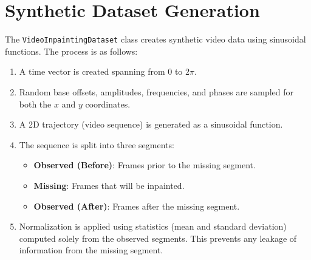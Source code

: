 \documentclass{article}
\begin{document}
\section{Synthetic Dataset Generation}
The \texttt{VideoInpaintingDataset} class creates synthetic video data using sinusoidal functions. The process is as follows:
\begin{enumerate}
    \item A time vector is created spanning from 0 to $2\pi$.
    \item Random base offsets, amplitudes, frequencies, and phases are sampled for both the $x$ and $y$ coordinates.
    \item A 2D trajectory (video sequence) is generated as a sinusoidal function.
    \item The sequence is split into three segments:
    \begin{itemize}
        \item \textbf{Observed (Before)}: Frames prior to the missing segment.
        \item \textbf{Missing}: Frames that will be inpainted.
        \item \textbf{Observed (After)}: Frames after the missing segment.
    \end{itemize}
    \item Normalization is applied using statistics (mean and standard deviation) computed solely from the observed segments. This prevents any leakage of information from the missing segment.
\end{enumerate}
\end{document}
